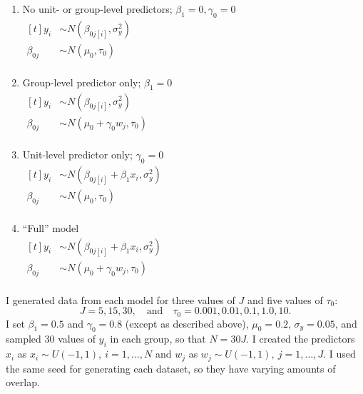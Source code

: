 \documentclass[10pt,a4paper]{article}
\begin{document}
\begin{enumerate}
	\item No unit- or group-level predictors; $\beta_1 = 0, \gamma_0 = 0$ \\[4pt]
	$\begin{aligned}[t]
	  y_i &\sim N(\beta_{0j[i]}, \sigma_y^2) \\[3pt]
	  \beta_{0j} &\sim N(\mu_0, \tau_0) \\[3pt]
	\end{aligned}$
	\item Group-level predictor only; $\beta_1 = 0$ \\[4pt]
	$\begin{aligned}[t]
	  y_i &\sim N(\beta_{0j[i]}, \sigma_y^2) \\[3pt]
	  \beta_{0j} &\sim N(\mu_0 + \gamma_0 w_j, \tau_0) \\[3pt]
	\end{aligned}$
	\item Unit-level predictor only; $\gamma_0 = 0$ \\[4pt]
	$\begin{aligned}[t]
	  y_i &\sim N(\beta_{0j[i]} + \beta_1 x_i, \sigma_y^2) \\[3pt]
	  \beta_{0j} &\sim N(\mu_0, \tau_0) \\[3pt]
	\end{aligned}$
	\item ``Full'' model \\[4pt]
	$\begin{aligned}[t]
	  y_i &\sim N(\beta_{0j[i]} + \beta_1 x_i, \sigma_y^2) \\[3pt]
	  \beta_{0j} &\sim N(\mu_0 + \gamma_0 w_j, \tau_0) \\[3pt]
	\end{aligned}$
\end{enumerate}
I generated data from each model for three values of $J$ and five values of $\tau_0$:
\[
	J = 5, 15, 30, \quad \text{and} \quad \tau_0 = 0.001, 0.01, 0.1, 1.0, 10.
\]
I set $\beta_1 = 0.5$ and $\gamma_0 = 0.8$ (except as described above), $\mu_0 = 0.2$, $\sigma_y = 0.05$, and  sampled 30 values of $y_i$ in each group, so that $N = 30J$. I created the predictors $x_i$ as $x_i \sim U(-1, 1), ~i = 1, \ldots, N$ and $w_j$ as $w_j \sim U(-1, 1), ~j = 1, \ldots , J$. I used the same seed for generating each dataset, so they have varying amounts of overlap.
\end{document}
